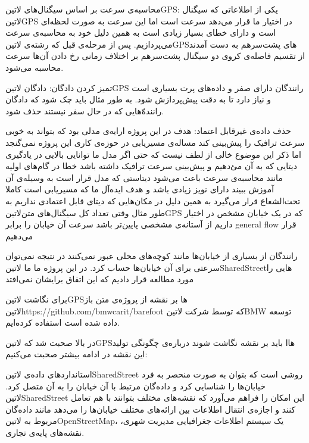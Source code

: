  محاسبه‌ی سرعت بر اساس سیگنال‌های ‌لاتین{GPS}: یکی از اطلاعاتی که سیگنال ‌لاتین{GPS} در اختیار ما قرار می‌دهد سرعت است اما این سرعت به صورت لحظه‌ای است و دارای خطای بسیار زیادی است به همین دلیل خود به محاسبه‌ی سرعت می‌پردازیم. پس از مرحله‌ی قبل که رشته‌ی ‌لاتین{GPS}های پشت‌سر‌هم به دست آمدند از تقسیم فاصله‌ی کروی دو سیگنال پشت‌سر‌هم بر اختلاف زمانی رخ دادن آن‌ها سرعت محاسبه می‌شود.


 تمیز کردن دادگان: دادگان ‌لاتین{GPS} رانندگان دارای صفر و داده‌های پرت بسیاری است و نیاز دارد تا به دقت پیش‌پردازش شود. به طور مثال باید چک شود که دادگان راننده‌ّهایی که در حال سفر نیستند حذف شود.

 حذف داده‌ی غیرقابل اعتماد: هدف در این پروژه ارایه‌ی مدلی بود که بتواند به خوبی سرعت ترافیک را پیش‌بینی کند مساله‌ی مسیریابی در حوزه‌ی کاری این پروژه نمی‌گنجد اما ذکر این موضوع خالی از لطف نیست که حتی اگر مدل ما توانایی بالایی در یادگیری دیتایی که به آن می‌ٔدهیم و پیش‌بینی سرعت ترافیک داشته باشد خطا در گام‌های اولیه مانند محاسبه‌ی سرعت باعث می‌شود دیتاستی که مدل قرار است به وسیله‌ی آن آموزش ببیند دارای نویز زیادی باشد و هدف ایده‌آل ما که مسیریابی است کاملا تحت‌الشعاع قرار می‌گیرد به همین دلیل در مکان‌هایی که دیتای قابل اعتمادی نداریم به طور مثال وقتی تعداد کل سیگنال‌های متن‌لاتین{GPS} که در یک خیابان مشخص در اختیار داریم از آستانه‌ی مشخصی پایین‌تر باشد سرعت آن خیابان را برابر general flow قرار می‌دهیم

 رانندگان از بسیاری از خیابان‌ها مانند کوچه‌های محلی  عبور نمی‌کنند در نتیجه نمی‌توان سرعتی برای آن خیابان‌ها حساب کرد. در این پروژه ما ما ‌لاتین{SharedStreet}‌هایی را مورد مطالعه قرار دادیم که این اتفاق برایشان نمی‌افتد

 برای نگاشت ‌لاتین{GPS}ها بر نقشه از پروژه‌ی متن باز ‌لاتین{https://github.com/bmwcarit/barefoot} که توسط شرکت ‌لاتین{BMW} توسعه داده شده است استفاده کرده‌ایم.


در بالا صحبت شد که ‌لاتین{GPS}هاا باید بر نقشه نگاشت شوند درباره‌ی چگونگی تولید این نقشه در ادامه بیشتر صحبت می‌کنیم:

استانداردهای داده‌ی ‌لاتین{SharedStreet} روشی است که بتوان به صورت منحصر به فرد خیابان‌ها را شناسایی کرد و داده‌گان مرتبط با آن خیابان را به آن متصل کرد. ‌لاتین{SharedStreet} این امکان را فراهم می‌آورد که نقشه‌های مختلف بتوانند با هم تعامل کنند و اجازه‌ی انتقال اطلاعات بین ارائه‌های مختلف خیابان‌ها را می‌دهد مانند داده‌گان مربوط به ‌لاتین{OpenStreetMap}، یک سیستم اطلاعات جغرافیایی مدیریت شهری، نقشه‌های پایه‌ی تجاری.

